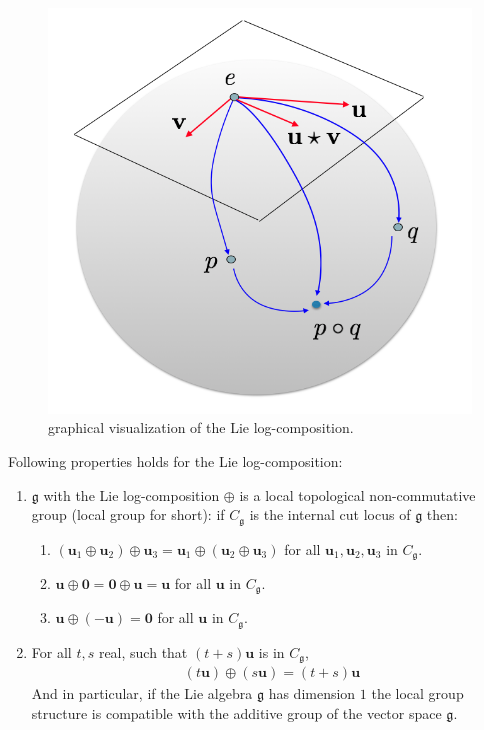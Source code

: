 \begin{figure}[!ht]
	\centering
	\includegraphics[scale=0.35]{figures/log_composition.png}
	\caption{graphical visualization of the Lie log-composition.}
	\label{fig:composition}
\end{figure}

\noindent
Following properties holds for the Lie log-composition:
\begin{enumerate}
	\item $\mathfrak{g} $ with the Lie log-composition $\oplus$ is a local topological non-commutative group (local group for short): if $C_{\mathfrak{g}}$ is the internal cut locus of $\mathfrak{g}$ then:
	\begin{enumerate}
		\item $(\mathbf{u}_{1}\oplus\mathbf{u}_{2}) \oplus \mathbf{u}_{3}
		= \mathbf{u}_{1}\oplus(\mathbf{u}_{2} \oplus \mathbf{u}_{3})$ for all $\mathbf{u}_{1}, \mathbf{u}_{2}, \mathbf{u}_{3}$ in $C_{\mathfrak{g}}$.
		\item $\mathbf{u}\oplus\mathbf{0}  = \mathbf{0}\oplus\mathbf{u} = \mathbf{u}$ for all $\mathbf{u}$ in $C_{\mathfrak{g}}$.
		\item $\mathbf{u}\oplus(-\mathbf{u} ) = \mathbf{0}$ for all $\mathbf{u}$ in $C_{\mathfrak{g}}$.
	\end{enumerate}
	\item For all $t,s$ real, such that $(t+s)\mathbf{u}$ is in $C_{\mathfrak{g}}$,
	\begin{align*}
	(t\mathbf{u})\oplus (s\mathbf{u}) = (t+s)\mathbf{u}
	\end{align*}
	And in particular, if the Lie algebra $\mathfrak{g}$ has dimension $1$ the local group structure is compatible with the additive group of the vector space $\mathfrak{g}$.
\end{enumerate}

